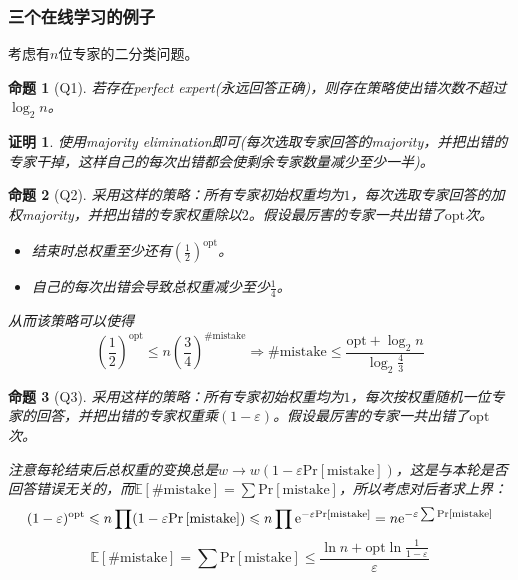 \documentclass[8pt]{article}
\theoremstyle{compact}
\newtheorem{proposition}{命题}
\newtheorem{Proof}{证明}
\def\le{\leqslant}
\def\Pr#1{\text{Pr}\left[{#1}\right]}
\def\E#1{\mathbb{E}\left[{#1}\right]}
\begin{document}
\subsubsection{三个在线学习的例子}
考虑有$n$位专家的二分类问题。

\begin{proposition}[Q1]
	若存在perfect expert(永远回答正确)，则存在策略使出错次数不超过$\log_2 n$。
\end{proposition}
\begin{Proof}
	使用majority elimination即可(每次选取专家回答的majority，并把出错的专家干掉，这样自己的每次出错都会使剩余专家数量减少至少一半)。
\end{Proof}
\begin{proposition}[Q2]
	 采用这样的策略：所有专家初始权重均为$1$，每次选取专家回答的加权majority，并把出错的专家权重除以$2$。假设最厉害的专家一共出错了$\text{opt}$次。
	 \begin{itemize}
	 	\item 结束时总权重至少还有$\left(\frac12\right)^{\text {opt}}$。
	 	\item 自己的每次出错会导致总权重减少至少$\frac14$。
	 \end{itemize}
	 从而该策略可以使得\begin{equation}
	 \left(\frac12\right)^{\text {opt}} \le n\left(\frac34\right)^{\#\text{mistake}}
	 \Rightarrow \#\text{mistake} \le \frac{\text{opt} + \log_2n}{\log_2\frac43}
	 \end{equation}
\end{proposition}
\begin{proposition}[Q3]
	采用这样的策略：所有专家初始权重均为$1$，每次按权重随机一位专家的回答，并把出错的专家权重乘$(1 - \varepsilon)$。假设最厉害的专家一共出错了$\text{opt}$次。
	
	注意每轮结束后总权重的变换总是$w \to w(1 - \varepsilon \Pr{\text{mistake}})$，这是与本轮是否回答错误无关的，而$\E{\#\text{mistake}} = \sum \Pr{\text{mistake}}$，所以考虑对后者求上界：
	\begin{equation}
	(1 - \varepsilon)^{\text{opt}} \le n\prod (1 - \varepsilon \Pr{\text{mistake}}) \le n\prod \text e^{-\varepsilon \Pr{\text{mistake}}} = n\text e^{-\varepsilon \sum \Pr{\text{mistake}}}
	\end{equation}
	\begin{equation}
	\E{\#\text{mistake}} = \sum \Pr{\text{mistake}} \le \frac{\ln n + \text{opt}\ln\frac{1}{1 - \varepsilon}}{\varepsilon}
	\end{equation}
\end{proposition}
\end{document}
